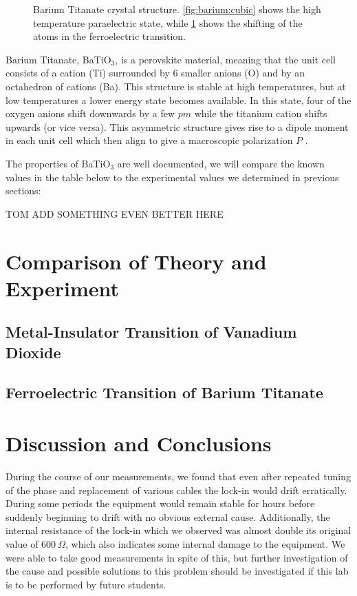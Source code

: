 \documentclass[%
 reprint,
 amsmath,amssymb,
 aps,
 pra,
]{revtex4-1}
\begin{document}
\begin{figure}[H]
\begin{subfigure}{0.24\textwidth}
		\caption{}
		\label{fig:barium:transition}
	\end{subfigure}
	\caption{Barium Titanate crystal structure. \ref{fig:barium:cubic} shows the high temperature paraelectric state, while \ref{fig:barium:transition} shows the shifting of the atoms in the ferroelectric transition.}
	\label{fig:barium}
\end{figure}

Barium Titanate, BaTiO$_3$, is a perovskite material, meaning that the unit cell consists of a cation (Ti) surrounded by 6 smaller anions (O) and by an octahedron of cations (Ba). This structure is stable at high temperatures, but at low temperatures a lower energy state becomes available. In this state, four of the oxygen anions shift downwards by a few $pm$ while the titanium cation shifts upwards (or vice versa). This asymmetric structure gives rise to a dipole moment in each unit cell which then align to give a macroscopic polarization $P$ \cite{manual}.

The properties of BaTiO$_3$ are well documented, we will compare the known values in the table below to the experimental values we determined in previous sections:

\begin{Huge}
TOM ADD SOMETHING EVEN BETTER HERE
\end{Huge}

\section{Comparison of Theory and Experiment}

\subsection{Metal-Insulator Transition of Vanadium Dioxide}

\subsection{Ferroelectric Transition of Barium Titanate}

\section{Discussion and Conclusions}

During the course of our measurements, we found that even after repeated tuning of the phase and replacement of various cables the lock-in would drift erratically. During some periods the equipment would remain stable for hours before suddenly beginning to drift with no obvious external cause. Additionally, the internal resistance of the lock-in which we observed was almost double its original value of $600~\Omega$, which also indicates some internal damage to the equipment. We were able to take good measurements in spite of this, but further investigation of the cause and possible solutions to this problem should be investigated if this lab is to be performed by future students. 
\end{document}
